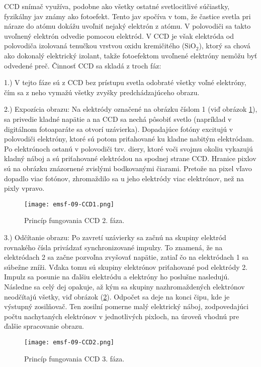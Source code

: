 \documentclass[../../main.tex]{subfiles}
\begin{document}
CCD snímač využíva, podobne ako všetky ostatné svetlocitlivé súčiastky, fyzikálny jav známy ako fotoefekt. Tento jav spočíva v tom, že častice svetla pri náraze do atómu dokážu uvoľniť nejaký elektrón z atómu. V polovodiči sa takto uvoľnený elektrón odvedie pomocou elektród. V CCD je však elektróda od polovodiča izolovaná tenučkou vrstvou oxidu kremičitého (SiO$_2$), ktorý sa chová ako dokonalý elektrický izolant, takže fotoefektom uvoľnené elektróny nemôžu byť odvedené preč. Činnosť CCD sa skladá z troch fáz:

1.) V tejto fáze sú z CCD bez prístupu svetla odobraté všetky voľné elektróny, čím sa z neho vymažú všetky zvyšky predchádzajúceho obrazu.

2.) Expozícia obrazu: Na elektródy označené na obrázku číslom 1 (viď obrázok \ref{em9:fig:CCD1}), sa privedie kladné napätie a na CCD sa nechá pôsobiť svetlo (napríklad v digitálnom fotoaparáte sa otvorí uzávierka). Dopadajúce fotóny excitujú v polovodiči elektróny, ktoré sú potom priťahované ku kladne nabitým elektródam. Po elektrónoch ostanú v polovodiči tzv. diery, ktoré voči svojmu okoliu vykazujú kladný náboj a sú priťahované elektródou na spodnej strane CCD. Hranice pixlov sú na obrázku znázornené zvislými bodkovanými čiarami. Pretože na pixel vľavo dopadlo viac fotónov, zhromaždilo sa u jeho elektródy viac elektrónov, než na pixly vpravo.

\begin{figure}[!h]
\texttt{[image: emsf-09-CCD1.png]}
\centering
\caption{Princíp fungovania CCD 2. fáza.}
\label{em9:fig:CCD1}
\end{figure}

3.) Odčítanie obrazu: Po zavretí uzávierky sa začnú na skupiny elektród rovnakého čísla privádzať synchronizované impulzy. To znamená, že na elektródach 2 sa začne pozvoľna zvyšovať napätie, zatiaľ čo na elektródach 1 sa súbežne zníži. Vďaka tomu sú skupiny elektrónov priťahované pod elektródy 2. Impulz sa posunie na ďalšiu elektródu a elektróny ho poslušne nasledujú. Následne sa celý dej opakuje, až kým sa skupiny nazhromaždených elektrónov neodčítajú všetky, viď obrázok (\ref{em9:fig:CCD2}). Odpočet sa deje na konci čipu, kde je výstupný zosilňovač. Ten zosilní pomerne malý elektrický náboj, zodpovedajúci počtu nachytaných elektrónov v jednotlivých pixloch, na úroveň vhodnú pre ďalšie spracovanie obrazu.

\begin{figure}[!h]
\texttt{[image: emsf-09-CCD2.png]}
\centering
\caption{Princíp fungovania CCD 3. fáza.}
\label{em9:fig:CCD2}
\end{figure}
\end{document}
